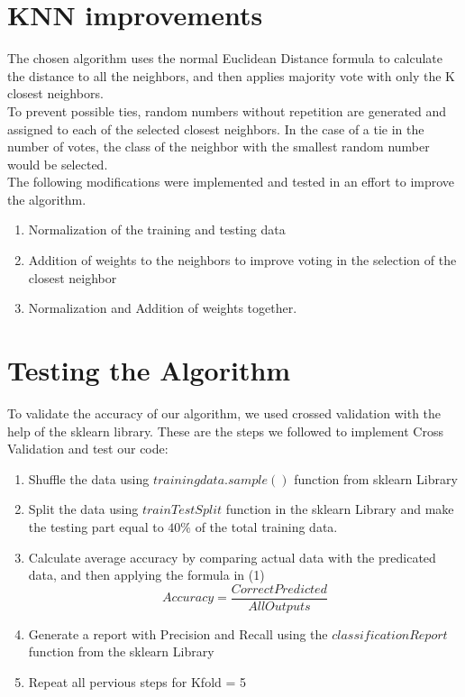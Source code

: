 \documentclass{article}
\begin{document}
\section{KNN improvements}  

The chosen algorithm uses the normal Euclidean Distance formula to calculate the distance to all the neighbors, and then applies majority vote with only the K closest neighbors. \\

To prevent possible ties, random numbers without repetition are generated and assigned to each of the selected closest neighbors. In the case of a tie in the number of votes, the class of the neighbor with the smallest random number would be selected. \\ The following modifications were implemented and tested in an effort to improve the algorithm.
\begin{enumerate}
\item Normalization of the training and testing data
\item Addition of weights to the neighbors to improve voting in the selection of the closest neighbor
\item Normalization and Addition of weights together.
\end{enumerate}

 \section{Testing the Algorithm}
To validate the accuracy of our algorithm, we used crossed validation with the help of the sklearn library. These are the steps we followed to implement Cross Validation and test our code:
 \begin{enumerate}
	\item Shuffle the data using  $ trainingdata.sample()$ function from sklearn Library 
	\item Split the data using $ trainTestSplit$ function in the sklearn Library and make the testing part equal to $40 \%$  of the total training data.
	\item Calculate average accuracy  by  comparing actual data with the predicated data, and then applying the formula in (1)
	\begin{equation}
	Accuracy = \frac{CorrectPredicted}{AllOutputs}
	\end{equation} 
	\item  Generate a report with Precision and Recall using the $classificationReport$ function from the sklearn Library
	\item Repeat all pervious steps for Kfold = 5
 \end{enumerate}
\end{document}
